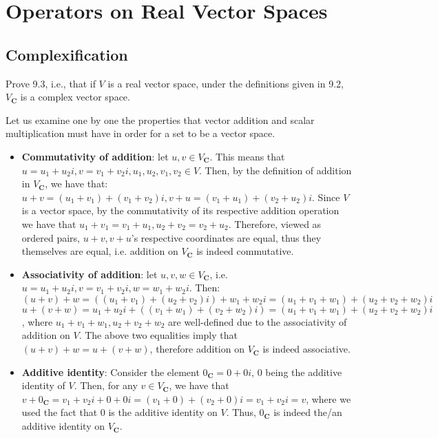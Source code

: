 \chapter{Operators on Real Vector Spaces}

\section{Complexification}

\begin{exercise}{1}
    Prove 9.3, i.e., that if $V$ is a real vector space, under the definitions given in 9.2, $V_\mathbf{C}$ is a complex vector space.
\end{exercise}

\begin{solution}
    Let us examine one by one the properties that vector addition and scalar multiplication must have in order for a set to be a vector space.
    \begin{itemize}
        \item \textbf{Commutativity of addition}: let $u, v \in V_\mathbf{C}$. This means that $u = u_1 + u_2i, v = v_1 + v_2i, u_1, u_2, v_1, v_2 \in V$. Then, by the definition of addition in $V_\mathbf{C}$, we have that: $u + v = (u_1+v_1) + (v_1+v_2)i, v+u = (v_1 + u_1) + (v_2 + u_2)i$. Since $V$ is a vector space, by the commutativity of its respective addition operation we have that $u_1 + v_1 = v_1 + u_1, u_2 + v_2 = v_2 + u_2$. Therefore, viewed as ordered pairs, $u+v, v+u$'s respective coordinates are equal, thus they themselves are equal, i.e. addition on $V_\mathbf{C}$ is indeed commutative.
        \item \textbf{Associativity of addition}: let $u, v, w \in V_\mathbf{C}$, i.e. $u = u_1 +u_2i, v = v_1 + v_2i, w = w_1 + w_2i$. Then:
        $$(u+v)+w = ( (u_1+v_1) + (u_2+v_2)i) + w_1 + w_2i = (u_1+v_1+w_1) + (u_2+v_2+w_2)i$$
        $$u + (v+w) = u_1 + u_2i + ((v_1+w_1)+(v_2+w_2)i) = (u_1+v_1+w_1) + (u_2+v_2+w_2)i$$
        , where $u_1+v_1+w_1, u_2+v_2+w_2$ are well-defined due to the associativity of addition on $V$. The above two equalities imply that $(u+v)+w = u+(v+w)$, therefore addition on $V_\mathbf{C}$ is indeed associative.
        \item \textbf{Additive identity}: Consider the element $0_\mathbf{C} = 0+0i$, 0 being the additive identity of $V$. Then, for any $v \in V_\mathbf{C}$, we have that $v+0_\mathbf{C} = v_1 + v_2i + 0 + 0i = (v_1+0) + (v_2+0)i = v_1 +v_2i = v$, where we used the fact that 0 is the additive identity on $V$. Thus, $0_\mathbf{C}$ is indeed the/an additive identity on $V_\mathbf{C}$.

\end{itemize}
\end{solution}
